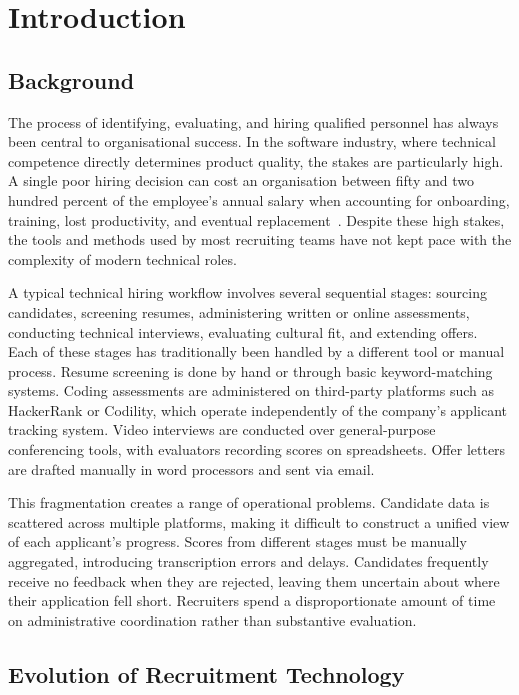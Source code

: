 \setcounter{chapter}{0}
\chapter{Introduction}
\label{ch:intro}

\section{Background}
\label{sec:background}

The process of identifying, evaluating, and hiring qualified personnel has always been central to organisational success. In the software industry, where technical competence directly determines product quality, the stakes are particularly high. A single poor hiring decision can cost an organisation between fifty and two hundred percent of the employee's annual salary when accounting for onboarding, training, lost productivity, and eventual replacement~\cite{shrm2022}. Despite these high stakes, the tools and methods used by most recruiting teams have not kept pace with the complexity of modern technical roles.

A typical technical hiring workflow involves several sequential stages: sourcing candidates, screening resumes, administering written or online assessments, conducting technical interviews, evaluating cultural fit, and extending offers. Each of these stages has traditionally been handled by a different tool or manual process. Resume screening is done by hand or through basic keyword-matching systems. Coding assessments are administered on third-party platforms such as HackerRank or Codility, which operate independently of the company's applicant tracking system. Video interviews are conducted over general-purpose conferencing tools, with evaluators recording scores on spreadsheets. Offer letters are drafted manually in word processors and sent via email.

This fragmentation creates a range of operational problems. Candidate data is scattered across multiple platforms, making it difficult to construct a unified view of each applicant's progress. Scores from different stages must be manually aggregated, introducing transcription errors and delays. Candidates frequently receive no feedback when they are rejected, leaving them uncertain about where their application fell short. Recruiters spend a disproportionate amount of time on administrative coordination rather than substantive evaluation.

\section{Evolution of Recruitment Technology}
\label{sec:evolution}

